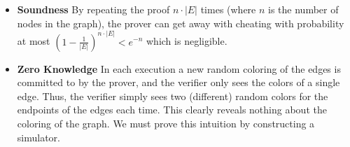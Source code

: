 \documentclass{beamer}
\begin{document}
    \begin{frame}
        \frametitle{}
        \begin{itemize}
            \item \textbf{Soundness} By repeating the proof $n \cdot|E|$ times (where $n$ is the number of nodes in the graph), the prover can get away with cheating with probability at most $\left(1-\frac{1}{|E|}\right)^{n \cdot|E|}<e^{-n}$ which is negligible. 
            \item \textbf{Zero Knowledge} In each execution a new random coloring of the edges is committed to by the prover, and the verifier only sees the colors of a single edge. Thus, the verifier simply sees two (different) random colors for the endpoints of the edges each time. This clearly reveals nothing about the coloring of the graph. We must prove this intuition by constructing a simulator.
        \end{itemize}
    
        
    
    \end{frame}
\end{document}
